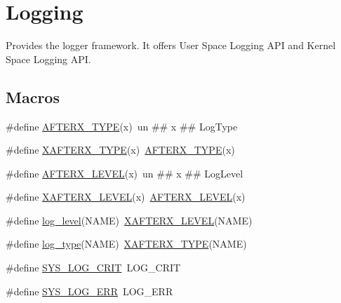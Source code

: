 \hypertarget{group__SYSFRAMEWORK__LOG}{\section{Logging}
\label{group__SYSFRAMEWORK__LOG}
}


Provides the logger framework. It offers User Space Logging A\-P\-I and Kernel Space Logging A\-P\-I.  


\subsection*{Macros}
\begin{DoxyCompactItemize}
\item 
\#define \hyperlink{group__SYSFRAMEWORK__LOG_ga0fc3c4b6b33474c081d5b7ebaf22eb5a}{A\-F\-T\-E\-R\-X\-\_\-\-T\-Y\-P\-E}(x)~un \#\# x \#\# Log\-Type
\item 
\#define \hyperlink{group__SYSFRAMEWORK__LOG_gab1d033b94f76cefe0ba0de1f1da3727c}{X\-A\-F\-T\-E\-R\-X\-\_\-\-T\-Y\-P\-E}(x)~\hyperlink{group__SYSFRAMEWORK__LOG_ga0fc3c4b6b33474c081d5b7ebaf22eb5a}{A\-F\-T\-E\-R\-X\-\_\-\-T\-Y\-P\-E}(x)
\item 
\#define \hyperlink{group__SYSFRAMEWORK__LOG_ga171078632f644bf6db8c72da116d0901}{A\-F\-T\-E\-R\-X\-\_\-\-L\-E\-V\-E\-L}(x)~un \#\# x \#\# Log\-Level
\item 
\#define \hyperlink{group__SYSFRAMEWORK__LOG_ga3f7bea0fb97f2e4ac1218aa0252200a5}{X\-A\-F\-T\-E\-R\-X\-\_\-\-L\-E\-V\-E\-L}(x)~\hyperlink{group__SYSFRAMEWORK__LOG_ga171078632f644bf6db8c72da116d0901}{A\-F\-T\-E\-R\-X\-\_\-\-L\-E\-V\-E\-L}(x)
\item 
\#define \hyperlink{group__SYSFRAMEWORK__LOG_gac128c680f6759a02825861c81929a394}{log\-\_\-level}(N\-A\-M\-E)~\hyperlink{group__SYSFRAMEWORK__LOG_ga3f7bea0fb97f2e4ac1218aa0252200a5}{X\-A\-F\-T\-E\-R\-X\-\_\-\-L\-E\-V\-E\-L}(N\-A\-M\-E)
\item 
\#define \hyperlink{group__SYSFRAMEWORK__LOG_ga6ba7163d1bf56b982e26207fd19c6423}{log\-\_\-type}(N\-A\-M\-E)~\hyperlink{group__SYSFRAMEWORK__LOG_gab1d033b94f76cefe0ba0de1f1da3727c}{X\-A\-F\-T\-E\-R\-X\-\_\-\-T\-Y\-P\-E}(N\-A\-M\-E)
\item 
\#define \hyperlink{group__SYSFRAMEWORK__LOG_ga3f5ab355c6ed1320ff2619abddadc680}{S\-Y\-S\-\_\-\-L\-O\-G\-\_\-\-C\-R\-I\-T}~L\-O\-G\-\_\-\-C\-R\-I\-T
\item 
\#define \hyperlink{group__SYSFRAMEWORK__LOG_gad121fa92bbdb74efb0c5e827ff4a03e1}{S\-Y\-S\-\_\-\-L\-O\-G\-\_\-\-E\-R\-R}~L\-O\-G\-\_\-\-E\-R\-R

\end{DoxyCompactItemize}

